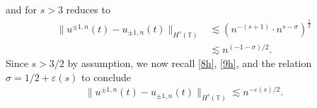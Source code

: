 \documentclass[12pt,reqno]{amsart}
\newcommand{\ci}{\mathbb{T}}
\newcommand{\ee}{\varepsilon}
\theoremstyle{plain}  %
\theoremstyle{definition}
\begin{document}
			and for $s > 3$ reduces to 
			\begin{equation}
				\begin{split}
					\|u^{\pm 1,n}(t) - u_{\pm 1, n}(t) \|_{H^s (\ci)}
					& \lesssim \left( n^{-\left( s+1 \right)} \cdot
					n^{s-\sigma}
					\right)^{\frac{1}{2}}
					\\
					& \lesssim n^{(-1-\sigma)/2}.
					\label{9h}
				\end{split}
			\end{equation}
			Since $s > 3/2 $ by assumption, we now recall \eqref{8h},
			\eqref{9h}, and the
			relation $\sigma = 1/2 + \ee(s)$ to conclude 
			\begin{equation}
				\begin{split}
					\|u^{\pm 1,n}(t) - u_{\pm 1, n}(t) \|_{H^s (\ci)} \lesssim
					n^{-\ee(s)/2}.
					\label{10h}
				\end{split}
			\end{equation}
			
\end{document}
